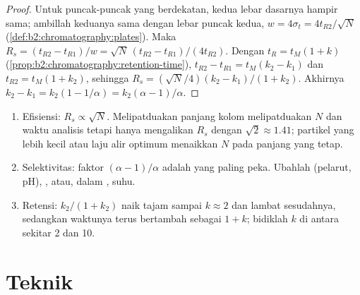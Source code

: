 \begin{proof}
Untuk puncak-puncak yang berdekatan, kedua lebar dasarnya hampir sama;
ambillah keduanya sama dengan lebar puncak kedua,
$w = 4\sigma_t = 4t_{R2}/\sqrt N$ (\cref{def:b2:chromatography:plates}). Maka $R_s = (t_{R2} -
t_{R1})/w = \sqrt N\,(t_{R2} - t_{R1})/(4t_{R2})$. Dengan $t_R = t_M(1 + k)$
(\cref{prop:b2:chromatography:retention-time}), $t_{R2} - t_{R1} = t_M(k_2 - k_1)$ dan $t_{R2} =
t_M(1 + k_2)$, sehingga $R_s = (\sqrt N/4)(k_2 - k_1)/(1 + k_2)$. Akhirnya $k_2 - k_1 = k_2(1 - 1/\alpha) =
k_2(\alpha - 1)/\alpha$.
\end{proof}

\begin{method}\label{met:b2:chromatography:improve-resolution}
\begin{enumerate}
  \item Efisiensi: $R_s \propto \sqrt N$. Melipatduakan panjang kolom
        melipatduakan $N$ dan waktu analisis
        tetapi hanya mengalikan $R_s$ dengan $\sqrt2 \approx 1.41$; partikel yang
        lebih kecil atau laju alir optimum menaikkan $N$ pada panjang yang tetap.
  \item Selektivitas: faktor $(\alpha - 1)/\alpha$ adalah yang paling peka.
        Ubahlah  (pelarut, pH), , atau, dalam , suhu.
  \item Retensi: $k_2/(1+k_2)$ naik tajam sampai $k \approx 2$ dan lambat
        sesudahnya, sedangkan waktunya terus bertambah sebagai $1 + k$;
        bidiklah $k$ di antara sekitar 2 dan 10.
\end{enumerate}
\end{method}

\section{Teknik}

